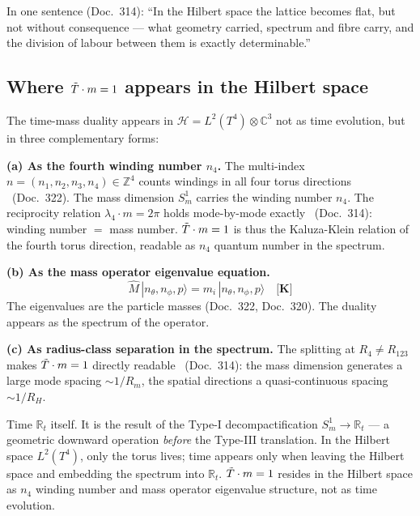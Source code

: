 In one sentence (Doc.~314): ``In the Hilbert space the lattice
becomes flat, but not without consequence — what geometry carried,
spectrum and fibre carry, and the division of labour between them
is exactly determinable.''

\subsection{Where $\tilde{T}\cdot m = 1$ appears in the Hilbert space \K}
\label{sec:duality-hilbert}

The time-mass duality appears in $\mathcal{H} = L^2(T^4)\otimes\mathbb{C}^3$
not as time evolution, but in three complementary forms:

\textbf{(a) As the fourth winding number $n_4$.}
The multi-index $n=(n_1,n_2,n_3,n_4)\in\mathbb{Z}^4$ counts windings
in all four torus directions \B\ (Doc.~322).
The mass dimension $S^1_m$ carries the winding number $n_4$.
The reciprocity relation $\lambda_4\cdot m = 2\pi$ holds mode-by-mode
exactly \K\ (Doc.~314): winding number $=$ mass number.
$\tilde{T}\cdot m = 1$ is thus the Kaluza-Klein relation of the fourth
torus direction, readable as $n_4$ quantum number in the spectrum.

\textbf{(b) As the mass operator eigenvalue equation.}
\begin{equation}
  \hat{M}\,|n_\theta,n_\phi,p\rangle = m_i\,|n_\theta,n_\phi,p\rangle
  \quad\textbf{[K]}
\end{equation}
The eigenvalues are the particle masses (Doc.~322, Doc.~320).
The duality appears as the spectrum of the operator.

\textbf{(c) As radius-class separation in the spectrum.}
The splitting at $R_4\neq R_{123}$ makes $\tilde{T}\cdot m = 1$
directly readable \K\ (Doc.~314): the mass dimension generates
a large mode spacing $\sim 1/R_m$, the spatial directions a
quasi-continuous spacing $\sim 1/R_H$.

\begin{tcolorbox}[ffgftbox,title={What does \emph{not} appear in the Hilbert space}]
  Time $\mathbb{R}_t$ itself. It is the result of the Type-I
  decompactification $S^1_m\to\mathbb{R}_t$ — a geometric downward
  operation \emph{before} the Type-III translation.
  In the Hilbert space $L^2(T^4)$, only the torus lives;
  time appears only when leaving the Hilbert space and embedding
  the spectrum into $\mathbb{R}_t$.
  $\tilde{T}\cdot m=1$ resides in the Hilbert space as $n_4$ winding
  number and mass operator eigenvalue structure, not as time evolution.
\end{tcolorbox}

